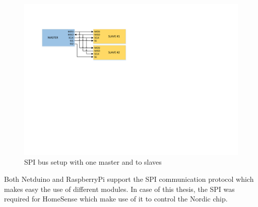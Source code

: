 \begin{figure}[H]\begin{center}
 \centering
  \captionsetup{justification=centering}
  \includegraphics[width=1\textwidth]{pictures/iosharp/spi-modules}
  \caption{SPI bus setup with one master and to slaves \label{fig:spi-modules}}
\end{center}\end{figure}

Both Netduino and RaspberryPi support the SPI communication protocol which makes easy the use of different modules. In case of this thesis, the SPI was required for HomeSense which make use of it to control the Nordic chip.

